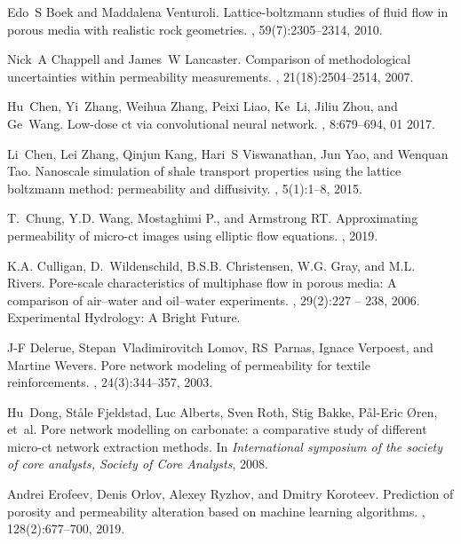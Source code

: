 \documentclass{article}
\begin{document}
\begin{thebibliography}{10}
Edo~S Boek and Maddalena Venturoli.
\newblock Lattice-boltzmann studies of fluid flow in porous media with
  realistic rock geometries.
, 59(7):2305--2314,
  2010.

Nick~A Chappell and James~W Lancaster.
\newblock Comparison of methodological uncertainties within permeability
  measurements.
,
  21(18):2504--2514, 2007.

Hu~Chen, Yi~Zhang, Weihua Zhang, Peixi Liao, Ke~Li, Jiliu Zhou, and Ge~Wang.
\newblock Low-dose ct via convolutional neural network.
, 8:679--694, 01 2017.

Li~Chen, Lei Zhang, Qinjun Kang, Hari~S Viswanathan, Jun Yao, and Wenquan Tao.
\newblock Nanoscale simulation of shale transport properties using the lattice
  boltzmann method: permeability and diffusivity.
, 5(1):1--8, 2015.

T.~Chung, Y.D. Wang, Mostaghimi P., and Armstrong RT.
\newblock Approximating permeability of micro-ct images using elliptic flow
  equations.
, 2019.

K.A. Culligan, D.~Wildenschild, B.S.B. Christensen, W.G. Gray, and M.L. Rivers.
\newblock Pore-scale characteristics of multiphase flow in porous media: A
  comparison of air–water and oil–water experiments.
, 29(2):227 -- 238, 2006.
\newblock Experimental Hydrology: A Bright Future.

J-F Delerue, Stepan~Vladimirovitch Lomov, RS~Parnas, Ignace Verpoest, and
  Martine Wevers.
\newblock Pore network modeling of permeability for textile reinforcements.
, 24(3):344--357, 2003.

Hu~Dong, St{\aa}le Fjeldstad, Luc Alberts, Sven Roth, Stig Bakke, P{\aa}l-Eric
  {\O}ren, et~al.
\newblock Pore network modelling on carbonate: a comparative study of different
  micro-ct network extraction methods.
\newblock In {\em International symposium of the society of core analysts,
  Society of Core Analysts}, 2008.

Andrei Erofeev, Denis Orlov, Alexey Ryzhov, and Dmitry Koroteev.
\newblock Prediction of porosity and permeability alteration based on machine
  learning algorithms.
, 128(2):677--700, 2019.


\end{thebibliography}
\end{document}
